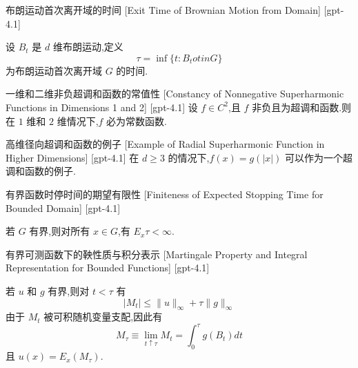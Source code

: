 \documentclass[UTF8]{ctexart}
\begin{document}
    \begin{dfn}
        {布朗运动首次离开域的时间}
        [Exit Time of Brownian Motion from Domain]
        [gpt-4.1]
        
设 $B_t$ 是 $d$ 维布朗运动,定义
\[
\tau = \operatorname{inf}\{ t : B_t 
otin G \}
\]
为布朗运动首次离开域 $G$ 的时间.

    \end{dfn}
    
    
    
    \begin{thm}
        {一维和二维非负超调和函数的常值性}
        [Constancy of Nonnegative Superharmonic Functions in Dimensions 1 and 2]
        [gpt-4.1]
        设 $f \in C^{2}$,且 $f$ 非负且为超调和函数.则在 $1$ 维和 $2$ 维情况下,$f$ 必为常数函数.
    \end{thm}
    
    
    
    \begin{xmp}
        {高维径向超调和函数的例子}
        [Example of Radial Superharmonic Function in Higher Dimensions]
        [gpt-4.1]
        在 $d \ge 3$ 的情况下,$f(x) = g(|x|)$ 可以作为一个超调和函数的例子.
    \end{xmp}
    
    
    
    \begin{thm}
        {有界函数时停时间的期望有限性}
        [Finiteness of Expected Stopping Time for Bounded Domain]
        [gpt-4.1]
        
若 $G$ 有界,则对所有 $x \in G$,有 $E_x \tau < \infty$.

    \end{thm}
    
    
    
    \begin{thm}
        {有界可测函数下的鞅性质与积分表示}
        [Martingale Property and Integral Representation for Bounded Functions]
        [gpt-4.1]
        
若 $u$ 和 $g$ 有界,则对 $t < \tau$ 有
\[
|M_t| \leq \|u\|_{\infty} + \tau \|g\|_{\infty}
\]
由于 $M_t$ 被可积随机变量支配,因此有
\[
M_{\tau} \equiv \lim_{t \uparrow \tau} M_t = \int_0^{\tau} g(B_t) dt
\]
且 $u(x) = E_x(M_{\tau})$.

    \end{thm}
    
\end{document}
